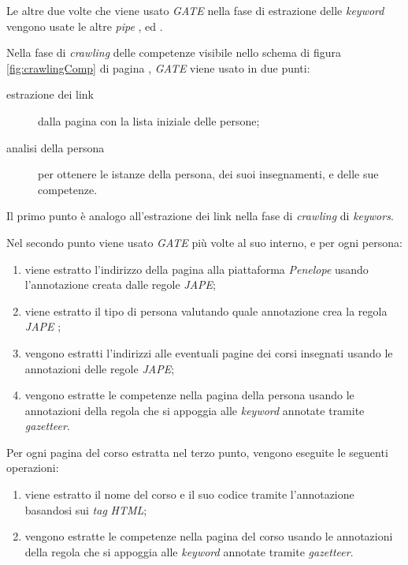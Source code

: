 \documentclass[tesi.tex]{subfiles}
\begin{document}
Le altre due volte che viene usato \emph{GATE} nella fase di
estrazione delle \emph{keyword} vengono usate le altre \emph{pipe}
,  ed .

Nella fase di \emph{crawling} delle competenze visibile nello schema
di figura \ref{fig:crawlingComp} di pagina \pageref{fig:crawlingComp},
\emph{GATE} viene usato in due punti:
\begin{description}
  \item[estrazione dei link] dalla pagina con la lista iniziale delle
    persone;
  \item[analisi della persona] per ottenere le istanze della persona,
    dei suoi insegnamenti, e delle sue competenze.
\end{description}
Il primo punto \`e analogo all'estrazione dei link nella
fase di \emph{crawling} di \emph{keywors}.

Nel secondo punto viene usato \emph{GATE} pi\`u volte al suo interno, e
per ogni persona:
\begin{enumerate}
\item  viene estratto l'indirizzo della pagina alla
  piattaforma \emph{Penelope} usando l'annotazione 
  creata dalle regole \emph{JAPE};
\item viene estratto il tipo di persona valutando quale annotazione
  crea la regola \emph{JAPE} ;
\item vengono estratti l'indirizzi alle eventuali pagine dei corsi
  insegnati usando le annotazioni  delle regole
  \emph{JAPE};
\item vengono estratte le competenze nella pagina della persona usando
  le annotazioni  della regola
   che si appoggia alle \emph{keyword}
  annotate tramite \emph{gazetteer}.
\end{enumerate}

Per ogni pagina del corso estratta nel terzo punto, vengono eseguite
le seguenti operazioni:
\begin{enumerate}
\item viene estratto il nome del corso e il suo codice tramite l'annotazione
   basandosi sui \emph{tag} \emph{HTML};
\item vengono estratte le competenze nella pagina del corso usando
  le annotazioni  della regola
   che si appoggia alle \emph{keyword}
  annotate tramite \emph{gazetteer}.
\end{enumerate}
\end{document}
